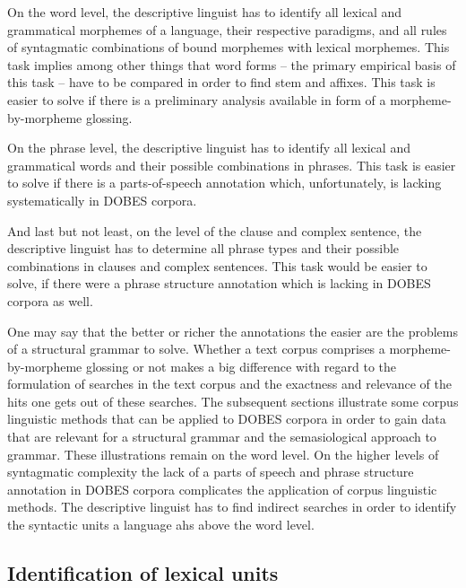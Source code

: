 On the word level, the descriptive linguist has to identify all lexical and grammatical morphemes of a language, their respective paradigms, and all rules of syntagmatic combinations of bound morphemes with lexical morphemes. This task implies among other things that word forms -- the primary empirical basis of this task -- have to be compared in order to find stem and affixes. This task is easier to solve if there is a preliminary analysis available in form of a morpheme-by-morpheme glossing. 

On the phrase level, the descriptive linguist has to identify all lexical and grammatical words and their possible combinations in phrases. This task is easier to solve if there is a parts-of-speech annotation which, unfortunately, is lacking systematically in DOBES corpora. 

And last but not least, on the level of the clause and complex sentence, the descriptive linguist has to determine all phrase types and their possible combinations in clauses and complex sentences. This task would be easier to solve, if there were a phrase structure annotation which is lacking in DOBES corpora as well. 

One may say that the better or richer the annotations the easier are the problems of a structural grammar to solve. Whether a text corpus comprises a morpheme-by-morpheme glossing or not makes a big difference with regard to the formulation of searches in the text corpus and the exactness and relevance of the hits one gets out of these searches. The subsequent sections illustrate some corpus linguistic methods that can be applied to DOBES corpora in order to gain data that are relevant for a structural grammar and the semasiological approach to grammar. These illustrations remain on the word level. On the higher levels of syntagmatic complexity the lack of a parts of speech and phrase structure annotation in DOBES corpora complicates the application of corpus linguistic methods. The descriptive linguist has to find indirect searches in order to identify the syntactic units a language ahs above the word level.

\subsection{Identification of lexical units}\label{bouda:sec:identificationoflexicaluntis}

